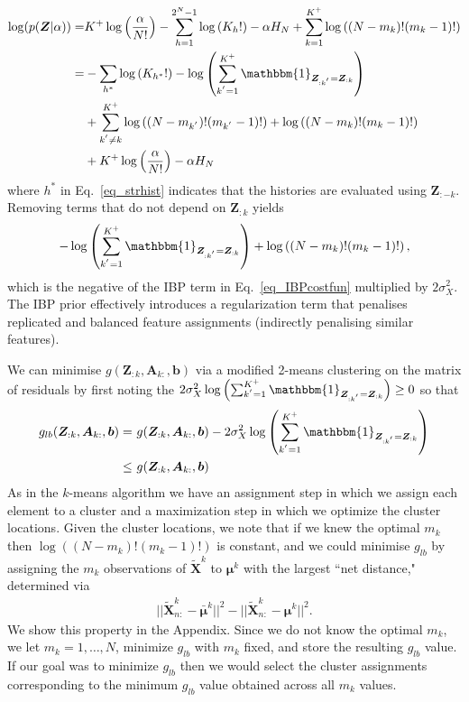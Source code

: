 \documentclass{article}
\numberwithin{equation}{section}
\numberwithin{thm}{section}
\def\IBP{\boldsymbol{Z}}
\def\Weights{\boldsymbol{A}}
\def\Residuals{\tilde{\boldsymbol{X}}}
\def\IBPPrior{\alpha}
\def\bias{\boldsymbol{b}}
\def\centre{\boldsymbol{\mu}}
\def\SigData{\sigma_X}
\def\sumIBP{m}
\begin{document}
%
\begin{align}
\log(p(\IBP|\alpha)) = &  K^+ \log\left(\frac{\IBPPrior}{N!}\right)- \sum_{h=1}^{2^N-1} \log\left(K_h!\right) -\IBPPrior H_N + \sum_{k=1}^{K^+}\log\left((N-\sumIBP_k)!(\sumIBP_k - 1)!\right) \notag 
\\
= & - \sum_{h^{*}} \log\left(K_{h^{*}}!\right) - \log\left(\sum_{k^{'}=1}^{K^{+}} \mathbbm{1}_{\IBP_{:k^{'}} = \IBP_{:k}}\right)  \label{eq_strhist}
\\
& + \sum_{k^{'} \neq k}^{K^+}\log\left((N-\sumIBP_{k^{'}})!(\sumIBP_{k^{'}}- 1)!\right) +  \log\left((N-\sumIBP_k)!(\sumIBP_k - 1)!\right)
\\
& + K^+ \log\left(\frac{\IBPPrior}{N!}\right) -\IBPPrior H_N
\end{align}
%
where $h^{*}$ in Eq.\ \ref{eq_strhist} indicates that the histories are evaluated using $\IBP_{:-k}$. Removing terms that do not depend on $\IBP_{:k}$ yields
%
\begin{align}
- \log\left(\sum_{k^{'}=1}^{K^{+}} \mathbbm{1}_{\IBP_{:k^{'}} = \IBP_{:k}}\right)  +  \log\left((N-\sumIBP_k)!(\sumIBP_k - 1)!\right),
\end{align} 
%
which is the negative of the IBP term in Eq.\ \ref{eq_IBPcostfun} multiplied by $2\SigData^2$. The IBP prior effectively introduces a regularization term that penalises replicated and  balanced feature assignments (indirectly penalising similar features). 

We can minimise $g(\IBP_{:k}, \Weights_{k:}, \bias)$ via a modified 2-means clustering on the matrix of residuals by first noting the $2\SigData^2 \log\left(\sum_{k^{'}=1}^{K^{+}} \mathbbm{1}_{\IBP_{:k^{'}} = \IBP_{:k}}\right) \geq 0$ so that 
\begin{align}
g_{lb}(\IBP_{:k}, \Weights_{k:}, \bias) =&~ g(\IBP_{:k}, \Weights_{k:}, \bias) - 2\SigData^2 \log\left(\sum_{k^{'}=1}^{K^{+}} \mathbbm{1}_{\IBP_{:k^{'}} = \IBP_{:k}}\right) \\
 \leq &~ g(\IBP_{:k}, \Weights_{k:}, \bias) 
\end{align}
%
As in the $k$-means algorithm we have an assignment step in which we assign each element to a cluster and a maximization step in which we optimize the cluster locations. Given the cluster locations, we note that if we knew the optimal $\sumIBP_k$ then $\log\left((N-\sumIBP_k)!(\sumIBP_k - 1)!\right)$ is constant, and we could minimise $g_{lb}$ by assigning the $\sumIBP_k$ observations of $\Residuals^k$ to $\centre^k$ with the largest ``net distance," determined via
\begin{align}
||\Residuals^k_{n:} - \bar{\centre}^k||^2 - ||\Residuals^k_{n:} - \centre^k||^2.
\end{align}
We show this property in the Appendix. Since we do not know the optimal $\sumIBP_k$, we let $\sumIBP_k = 1,\ldots,N$, minimize $g_{lb}$ with $\sumIBP_k$ fixed, and store the resulting $g_{lb}$ value. If our goal was to minimize $g_{lb}$ then we would select the cluster assignments corresponding to the minimum $g_{lb}$ value obtained across all $m_k$ values.
\end{document}
